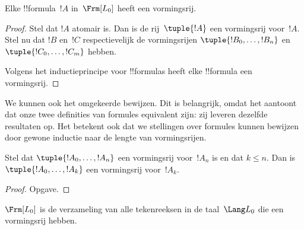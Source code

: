 \documentclass[openany]{memoir}
\begin{document}
\begin{prop}
Elke !!{formula}~$!A$ in~$\Frm[L_0]$ heeft een vormingsrij.
\end{prop}

\begin{proof}
Stel dat $!A$ atomair is. Dan is de rij~$\tuple{!A}$ een vormingsrij
voor~$!A$.
%
Stel nu dat $!B$ en~$!C$ respectievelijk de vormingsrijen
$\tuple{!B_0,\dotsc,!B_n}$ en $\tuple{!C_0,\dotsc,!C_m}$ hebben.
%
\begin{enumerate}
\end{enumerate}
Volgens het inductieprincipe voor !!{formula}s heeft elke !!{formula}
een vormingsrij.
\end{proof}

We kunnen ook het omgekeerde bewijzen. Dit is belangrijk, omdat het
aantoont dat onze twee definities van formules equivalent zijn: zij
leveren dezelfde resultaten op. Het betekent ook dat we stellingen
over formules kunnen bewijzen door gewone inductie naar de lengte van
vormingsrijen.

\begin{lem}
Stel dat $\tuple{!A_0,\dotsc,!A_n}$ een vormingsrij voor~$!A_n$ is en
dat $k \leq n$. Dan is $\tuple{!A_0,\dotsc,!A_k}$ een vormingsrij
voor~$!A_k$.
\end{lem}

\begin{proof}
Opgave.
\end{proof}

\begin{thm}
$\Frm[L_0]$ is de verzameling van alle tekenreeksen in de
taal~$\Lang L_0$ die een vormingsrij hebben.
\end{thm}
\end{document}
